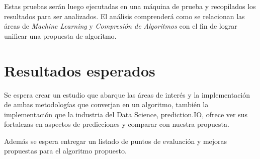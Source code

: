 \documentclass{udparticle}
\begin{document}
Estas pruebas serán luego ejecutadas en una máquina de prueba y recopilados los resultados para ser analizados.
El análisis comprenderá como se relacionan las áreas de \emph{Machine Learning} y \emph{Compresión de Algoritmos} con el fin de lograr unificar una propuesta de algoritmo. 

\section{Resultados esperados}

Se espera crear un estudio que abarque las áreas de interés y la implementación de ambas metodologías que converjan en un algoritmo, 
también la implementación que la industria del Data Science, prediction.IO, ofrece ver sus fortalezas en aspectos de predicciones y comparar con nuestra propuesta.

Además se espera entregar un listado de puntos de evaluación y mejoras propuestas para el algoritmo propuesto.

\newpage
\end{document}
